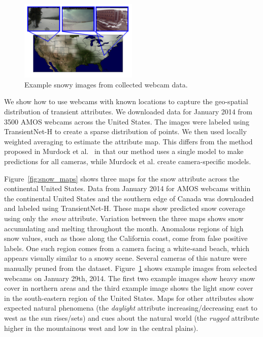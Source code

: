 \documentclass[10pt,twocolumn,letterpaper]{article}
\newcommand{\figref}[1]{Figure~\ref{fig:#1}}
\begin{document}
\begin{figure}[t]
	\centering
		\includegraphics[width=0.5\textwidth, trim= 0mm 10mm 0mm 0mm]{figs/snow_exs.pdf}
		\caption{Example snowy images from collected webcam data.}
		\label{fig:snow_exs}
\end{figure}

We show how to use webcams with known locations to capture the geo-spatial
distribution of transient attributes. We downloaded data for January 2014 from
3500 AMOS webcams across the United States.  The images were labeled using
TransientNet-H to create a sparse distribution of points.  We then used locally
weighted averaging to estimate the attribute map.  This differs from the method
proposed in Murdock et al.~\cite{murdock13clouds} in that our method uses a
single model to make predictions for all cameras, while Murdock et al. create
camera-specific models.

\figref{snow_maps} shows
three maps for the snow attribute across the continental United States.  Data
from January 2014 for AMOS webcams within the continental United States and the
southern edge of Canada was downloaded and labeled using TransientNet-H. These
maps show predicted snow coverage using only the \emph{snow} attribute.
Variation between the three maps shows snow accumulating and melting throughout
the month.  Anomalous regions of high snow values, such as those along the
California coast, come from false positive labels.  One such region comes from
a camera facing a white-sand beach, which appears visually similar to a snowy
scene.  Several cameras of this nature were manually pruned from the dataset.
\figref{snow_exs} shows example images from selected webcams on January 29th,
2014. The first two example images show heavy snow cover in northern areas and
the third example image shows the light snow cover in the south-eastern region
of the United States.  Maps for other attributes show expected natural
phenomena (the \textit{daylight} attribute increasing/decreasing east to west
as the sun rises/sets) and cues about the natural world (the \textit{rugged}
attribute higher in the mountainous west and low in the central plains).  
\end{document}

